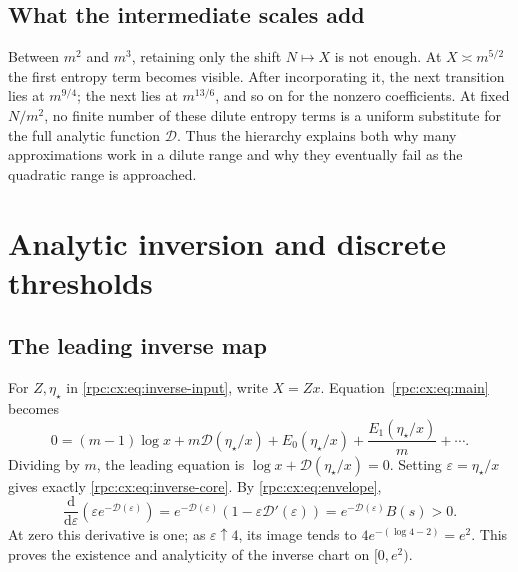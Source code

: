 \documentclass[11pt]{article}
\theoremstyle{definition}
\theoremstyle{remark}
\numberwithin{equation}{section}
\begin{document}
\subsection{What the intermediate scales add}
Between $m^2$ and $m^3$, retaining only the shift $N\mapsto X$ is not
enough. At $X\asymp m^{5/2}$ the first entropy term becomes visible.
After incorporating it, the next transition lies at $m^{9/4}$; the
next lies at $m^{13/6}$, and so on for the nonzero coefficients.
At fixed $N/m^2$, no finite number of these dilute entropy terms is a
uniform substitute for the full analytic function $\mathcal D$. Thus the
hierarchy explains both why many approximations work in a dilute range
and why they eventually fail as the quadratic range is approached.

\section{Analytic inversion and discrete thresholds}\label{rpc:cx:sec:inverse}

\subsection{The leading inverse map}
For $Z,\eta_\star$ in \eqref{rpc:cx:eq:inverse-input}, write $X=Zx$.
Equation~\eqref{rpc:cx:eq:main} becomes
\begin{equation}\label{rpc:cx:eq:inverse-eq}
 0=(m-1)\log x+m\mathcal D(\eta_\star/x)+E_0(\eta_\star/x)
          +\frac{E_1(\eta_\star/x)}m+\cdots.
\end{equation}
Dividing by $m$, the leading equation is
$\log x+\mathcal D(\eta_\star/x)=0$. Setting $\varepsilon=\eta_\star/x$ gives exactly
\eqref{rpc:cx:eq:inverse-core}.
By \eqref{rpc:cx:eq:envelope},
\begin{equation}\label{rpc:cx:eq:inverse-monotone}
 \frac{\mathrm d}{\mathrm d\varepsilon}(\varepsilon e^{-\mathcal D(\varepsilon)})
   =e^{-\mathcal D(\varepsilon)}(1-\varepsilon \mathcal D'(\varepsilon))
   =e^{-\mathcal D(\varepsilon)}B(s)>0.
\end{equation}
At zero this derivative is one; as $\varepsilon\uparrow4$, its image tends to
$4e^{-(\log4-2)}=e^2$. This proves the existence and analyticity of the
inverse chart on $[0,e^2)$.
\end{document}
